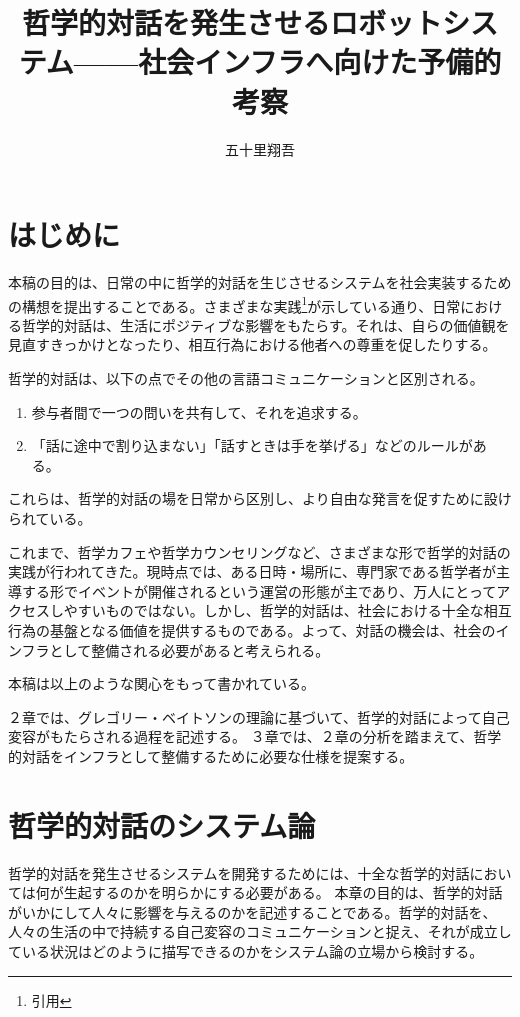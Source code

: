\documentclass[b5j,twoside,twocolumn]{utarticle}
\title{哲学的対話を発生させるロボットシステム------社会インフラへ向けた予備的考察}
\author{五十里翔吾}
\date{\vspace{-5mm}}
\makeatletter
\def\yakuchu{%
\@ifnextchar[\@xfootnote %
{\stepcounter{yakuchu}%
\protected@xdef\@thefnmark{\theyakuchu}%
\@footnotemark\@footnotetext}}
\makeatother
\begin{document}
\maketitle

\setlength{\footskip}{-2mm}
\chead[]{}
\lfoot[]{\thepage{}}
\cfoot[]{}
\rfoot[\thepage{}]{}

\let\yakuchu=\endnote
\renewcommand{\footnoterule}{\noindent\rule{100mm}{0.3mm}\vskip2mm}
\thispagestyle{fancy}
\section{はじめに}
本稿の目的は、日常の中に哲学的対話を生じさせるシステムを社会実装するための構想を提出することである。さまざまな実践\footnote{引用}が示している通り、日常における哲学的対話は、生活にポジティブな影響をもたらす。それは、自らの価値観を見直すきっかけとなったり、相互行為における他者への尊重を促したりする。


哲学的対話は、以下の点でその他の言語コミュニケーションと区別される。
\begin{enumerate}
\renewcommand{\labelenumi}{\pbox<y>{(\arabic{enumi})}}
\item 参与者間で一つの問いを共有して、それを追求する。
\item 「話に途中で割り込まない」「話すときは手を挙げる」などのルールがある。
\end{enumerate}
これらは、哲学的対話の場を日常から区別し、より自由な発言を促すために設けられている。


これまで、哲学カフェや哲学カウンセリングなど、さまざまな形で哲学的対話の実践が行われてきた。現時点では、ある日時・場所に、専門家である哲学者が主導する形でイベントが開催されるという運営の形態が主であり、万人にとってアクセスしやすいものではない。しかし、哲学的対話は、社会における十全な相互行為の基盤となる価値を提供するものである。よって、対話の機会は、社会のインフラとして整備される必要があると考えられる。


本稿は以上のような関心をもって書かれている。


２章では、グレゴリー・ベイトソンの理論に基づいて、哲学的対話によって自己変容がもたらされる過程を記述する。
３章では、２章の分析を踏まえて、哲学的対話をインフラとして整備するために必要な仕様を提案する。



\section{哲学的対話のシステム論}
哲学的対話を発生させるシステムを開発するためには、十全な哲学的対話においては何が生起するのかを明らかにする必要がある。
本章の目的は、哲学的対話がいかにして人々に影響を与えるのかを記述することである。哲学的対話を、人々の生活の中で持続する自己変容のコミュニケーションと捉え、それが成立している状況はどのように描写できるのかをシステム論の立場から検討する。
\end{document}
